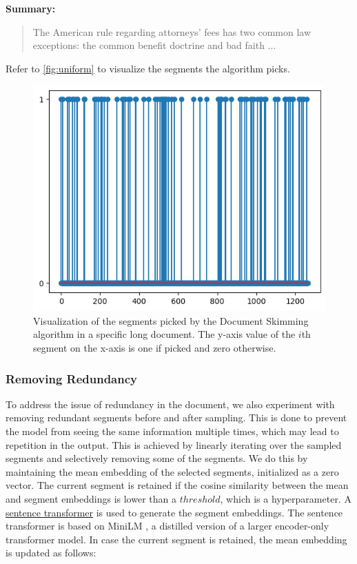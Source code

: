 \noindent \textbf{Summary:}
\begin{quote}
  The American rule regarding attorneys' fees has two common law exceptions: the common benefit doctrine and bad faith ...
\end{quote}

Refer to \autoref{fig:uniform} to visualize the segments the algorithm picks.

\begin{figure}
  \centering
  \includegraphics*[width=.45\textwidth]{images/uniform.png}
  \caption{
    Visualization of the segments picked by the Document Skimming algorithm in a specific long document.
    The y-axis value of the $i$th segment on the x-axis is one if picked and zero otherwise.
  }
  \label{fig:uniform}
\end{figure}

\subsubsection*{Removing Redundancy}

To address the issue of redundancy in the document, we also experiment with removing redundant segments before and after sampling.
This is done to prevent the model from seeing the same information multiple times, which may lead to repetition in the output.
This is achieved by linearly iterating over the sampled segments and selectively removing some of the segments.
We do this by maintaining the mean embedding of the selected segments, initialized as a zero vector.
The current segment is retained if the cosine similarity between the mean and segment embeddings is lower than a $threshold$, which is a hyperparameter.
A \href{https://huggingface.co/sentence-transformers/all-MiniLM-L6-v2}{sentence transformer} is used to generate the segment embeddings.
The sentence transformer is based on MiniLM \cite{wang2020minilm}, a distilled version of a larger encoder-only transformer model.
In case the current segment is retained, the mean embedding is updated as follows:

